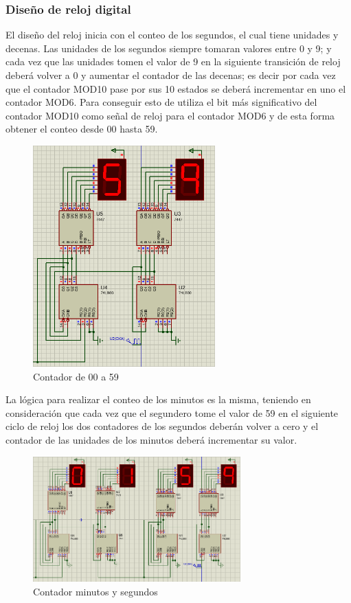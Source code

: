 \documentclass[journal]{IEEEtran}
\begin{document}
\subsubsection{Diseño de reloj digital}
El diseño del reloj inicia con el conteo de los segundos, el cual tiene unidades y decenas. Las unidades de los segundos siempre tomaran valores entre 0 y 9; y cada vez que las unidades tomen  el  valor  de 9 en la siguiente  transición de reloj deberá volver a 0 y aumentar el contador de las decenas; es decir por cada vez que el contador MOD10 pase por sus 10 estados se deberá incrementar en uno el contador MOD6.  
\newline
Para conseguir esto de utiliza el bit más significativo del contador MOD10 como señal de reloj para el contador MOD6 y de esta forma obtener el conteo desde 00 hasta 59.
\begin{figure}[htb]
    \centering
    \includegraphics[width=7cm]{images/image6.png}
    \caption{Contador de 00 a 59}
    \label{cont_59}
\end{figure}
\newline
La lógica para realizar el conteo de los minutos es la misma, teniendo en consideración que cada vez que el segundero tome el valor de 59 en el siguiente ciclo de reloj los dos contadores de  los  segundos  deberán  volver  a  cero  y  el  contador  de  las  unidades de  los minutos deberá incrementar su valor.
\newpage
\begin{figure}[htb]
    \centering
    \includegraphics[width=8cm]{images/image7.png}
    \caption{Contador minutos y segundos}
    \label{cont_hs}
\end{figure}
\end{document}
